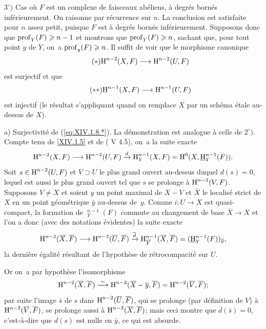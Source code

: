 $3^\circ)$ Cas o\`u $F$ est un complexe de faisceaux ab\'eliens, \`a degr\'es born\'es inf\'erieurement. On raisonne par r\'ecurrence sur $n$. La conclusion est satisfaite pour $n$ assez petit, puisque $F$ est \`a degr\'es born\'es inf\'erieurement. Supposons donc que $\operatorname{prof}_Y(F)\geqslant n-1$ et montrons que $\operatorname{prof}_Y(F)\geqslant n$, sachant que, pour tout point $y$ de $Y$, on~a $\operatorname{prof}_y(F)\geqslant n$. Il suffit de voir que le morphisme canonique
\begin{equation*} \label{eq:XIV.1.8.*} \tag{$*$} {\H^{n-2}(X, F)\to \H^{n-2}(U, F)}
\end{equation*}
est surjectif et que
\begin{equation*} \label{eq:XIV.1.8.**} \tag{$**$} {\H^{n-1}(X, F)\to \H^{n-1}(U, F)}
\end{equation*}
est injectif (le r\'esultat s'appliquant quand on remplace $X$ par un sch\'ema \'etale au-dessus de $X$).

a) Surjectivit\'e de (\ref{eq:XIV.1.8.*}). La d\'emonstration est analogue \`a celle de $2^\circ)$. Compte tenu de \ref{XIV.1.5} et de ( V 4.5), on~a la suite exacte
$$
\H^{n-2}(X, F)\to \H^{n-2}(U, F)\lto{d}\H^{n-1}_Y(X, F)=\H^0(X, {\mathop{\underline{\mathrm{H}}}\nolimits}_Y^{n-1}(F)).
$$
Soit $s\in \operatorname{H}^{n-2}(U, F)$ et $V\supset U$ le plus grand ouvert au-dessus duquel $d(s)=0$, lequel est aussi le plus grand ouvert tel que $s$ se prolonge \`a $\operatorname{H}^{n-2}(V, F)$. Supposons $V\neq X$ et soient $y$ un point maximal de $X-V$ et $\bar X$ le localis\'e strict de $X$ en un point g\'eom\'etrique $\bar y$ au-dessus de~$y$. Comme $i:U\to X$ est quasi-compact, la formation de ${\mathop{\underline{\mathrm{H}}}\nolimits}_Y^{n-1}(F)$ commute au changement de base $\bar X\to X$ et l'on a donc (avec des notations \'evidentes) la suite exacte
$$
\H^{n-2}(\bar X, \bar F)\to \H^{n-2}(\bar U, \bar F)\lto{\bar d}\H^{n-1}_{\bar Y}(\bar X, \bar F)=({\mathop{\underline{\mathrm{H}}}\nolimits}_Y^{n-1}(F))_{\bar y},
$$
la derni\`ere \'egalit\'e r\'esultant de l'hypoth\`ese de r\'etrocompacit\'e sur $U$.

Or on~a par hypoth\`ese l'isomorphisme
$$
\operatorname{H}^{n-2}(\overline X, \overline F)\overset{\sim}{\longrightarrow} \operatorname{H}^{n-2}(\overline X-\overline y, \overline F)=\operatorname{H}^{n-2}(\overline V, \overline F);
$$
par suite l'image $\bar s$ de $s$ dans $\operatorname{H}^{n-2}(\overline U, \overline F)$, qui se prolonge (par d\'efinition de $V$) \`a $\operatorname{H}^{n-2}(\overline V, \overline F)$, se prolonge aussi \`a $\operatorname{H}^{n-2}(\overline X, \overline F)$; mais ceci montre que $\bar d(\bar s)=0$, c'est-\`a-dire que $d(s)$ est nulle en $\bar y$, ce qui est absurde.

